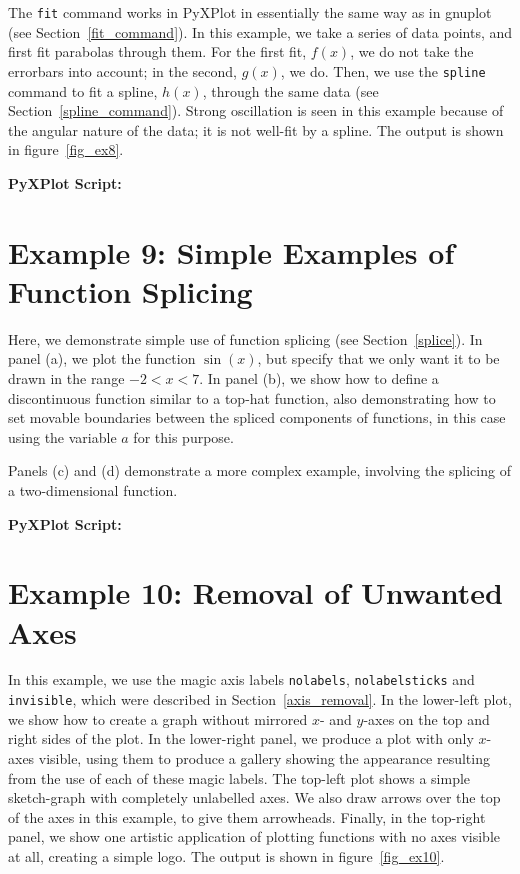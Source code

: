 \documentclass[a4paper,onecolumn,11pt]{book}
\begin{document}

The \texttt{fit} command works in PyXPlot in essentially the same way as in
gnuplot (see Section~\ref{fit_command}). In this example, we take a series of
data points, and first fit parabolas through them. For the first fit, $f(x)$,
we do not take the errorbars into account; in the second, $g(x)$, we do. Then,
we use the \texttt{spline} command to fit a spline, $h(x)$, through the same
data (see Section~\ref{spline_command}). Strong oscillation is seen in this
example because of the angular nature of the data; it is not well-fit by a
spline. The output is shown in figure~\ref{fig_ex8}.

\vspace{1cm}
\noindent \textbf{PyXPlot Script:}


\newpage
\section{Example 9: Simple Examples of Function Splicing}

Here, we demonstrate simple use of function splicing (see
Section~\ref{splice}). In panel (a), we plot the function $\sin(x)$, but
specify that we only want it to be drawn in the range $-2<x<7$. In panel (b),
we show how to define a discontinuous function similar to a top-hat function,
also demonstrating how to set movable boundaries between the spliced components
of functions, in this case using the variable $a$ for this purpose.

Panels (c) and (d) demonstrate a more complex example, involving the splicing
of a two-dimensional function.

\vspace{1cm}
\noindent \textbf{PyXPlot Script:}


\newpage
\section{Example 10: Removal of Unwanted Axes}
\label{ex10}

In this example, we use the magic axis labels \texttt{nolabels},
\texttt{nolabelsticks} and \texttt{invisible}, which were described in
Section~\ref{axis_removal}. In the lower-left plot, we show how to create a
graph without mirrored $x$- and $y$-axes on the top and right sides of the
plot. In the lower-right panel, we produce a plot with only $x$-axes visible,
using them to produce a gallery showing the appearance resulting from the use
of each of these magic labels. The top-left plot shows a simple sketch-graph
with completely unlabelled axes. We also draw arrows over the top of the axes
in this example, to give them arrowheads. Finally, in the top-right panel, we
show one artistic application of plotting functions with no axes visible at
all, creating a simple logo. The output is shown in figure~\ref{fig_ex10}.
\end{document}

